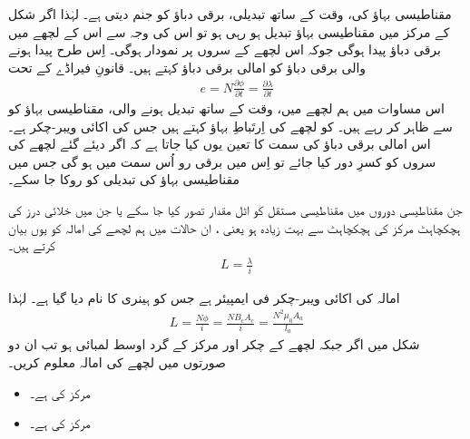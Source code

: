 مقناطیسی بہاؤ کی، وقت کے ساتھ تبدیلی، برقی دباؤ  کو جنم دیتی ہے۔ لہٰذا  اگر شکل  کے مرکز میں مقناطیسی بہاؤ تبدیل ہو رہی ہو تو اس کی وجہ سے اس کے لچھے میں برقی دباؤ پیدا ہوگی جوکہ اس لچھے کے سروں پر نمودار ہوگی۔ اِس طرح پیدا ہونے والی برقی دباؤ کو امالی برقی دباؤ  کہتے ہیں۔ قانونِ فیراڈے  کے تحت
\begin{align}
e=N \frac{\partial \phi}{\partial t} =\frac{\partial \lambda}{\partial t}
\end{align}
اس مساوات میں ہم لچھے میں، وقت کے ساتھ تبدیل ہونے والی، مقناطیسی بہاؤ کو  سے ظاہر کر رہے ہیں۔ کو لچھے کی اِرتَباطِ بہاؤ   کہتے ہیں جس کی اکائی ویبر-چکر  ہے۔ اس امالی برقی دباؤ  کی سمت کا تعین یوں کیا جاتا ہے کہ اگر دیئے گئے لچھے کی سروں کو کسرِ دور   کیا جائے تو اِس میں برقی رو اُس سمت میں ہو گی جس میں مقناطیسی بہاؤ کی تبدیلی کو روکا جا سکے۔ 

جن مقناطیسی دوروں میں مقناطیسی مستقل   کو اٹل مقدار تصور کیا جا سکے یا جن میں خلائی درز کی ہچکچاہٹ مرکز کی ہچکچاہٹ سے بہت زیادہ ہو یعنی  ، ان حالات میں ہم لچھے کی  امالہ   کو یوں بیان کرتے ہیں۔
\begin{align}
L=\frac{\lambda}{i}
\end{align}

امالہ کی اکائی ویبر-چکر فی ایمپیئر ہے جس کو ہینری  کا نام دیا گیا ہے۔ لہٰذا
\begin{align}
L=\frac{N \phi}{i}=\frac{N B_c A_c}{i}=\frac{N^2 \mu_0 A_a}{l_a}
\end{align}
%
شکل میں اگر  جبکہ لچھے کے  چکر اور مرکز کے گرد اوسط لمبائی  ہو تب ان دو صورتوں میں لچھے کی امالہ معلوم کریں۔
\begin{itemize}
\item
مرکز کی  ہے۔
\item
مرکز کی  ہے۔
\end{itemize}

